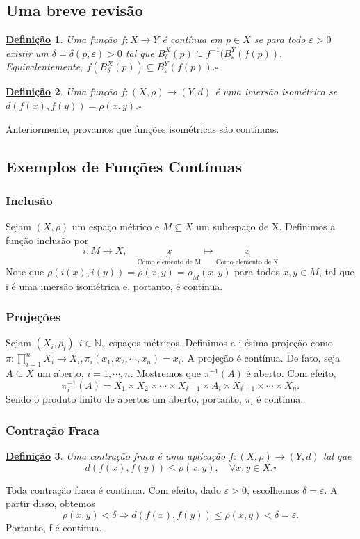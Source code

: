 \documentclass{article}
\newtheorem*{def*}{\underline{Defini\c c\~ao}}
\begin{document}
\subsection{Uma breve revisão}
 \begin{def*}
   Uma função \(f:X\rightarrow Y\) é contínua em \(p\in X\) se para todo \(\varepsilon >0\) existir um
  \(\delta =\delta (p, \varepsilon)>0\) tal que \(B_{\delta }^{X}(p)\subseteq{f^{-1}(B_{\varepsilon }^{Y}(f(p))}.\)
  Equivalentemente, \(f(B_{\delta }^{X}(p))\subseteq{B_{\varepsilon }^{Y}(f(p))}.\square\)
 \end{def*}
\begin{def*}
  Uma função \(f:(X, \rho )\rightarrow (Y, d)\) é uma imersão isométrica se \(d(f(x), f(y)) = \rho (x, y).\square\)
\end{def*}
  Anteriormente, provamos que funções isométricas são contínuas.
\subsection{Exemplos de Funções Contínuas}
\subsubsection{Inclusão}
  Sejam \((X, \rho )\) um espaço métrico e \(M\subseteq{X}\) um subespaço de X. Definimos a função inclusão por 
    \[
      i:M\rightarrow X,\quad \underbrace{x}_{\text{Como elemento de M}}\longmapsto \underbrace{x}_{\text{Como elemento de X}}
    \]
  Note que \(\rho (i(x), i(y)) = \rho (x, y) = \rho_{M}(x, y)\) para todos \(x, y\in M\), tal que i é uma imersão isométrica
e, portanto, é contínua.
\subsubsection{Projeções}
  Sejam \((X_{i}, \rho_{i}), i\in \mathbb{N},\) espaços métricos. Definimos a i-ésima projeção como
 \(\pi :\prod\limits_{i=1}^{n}X_{i}\rightarrow X_{i}, \pi_{i}(x_1, x_2, \cdots, x_{n}) = x_{i}.\) A projeção
 é contínua. De fato, seja \(A\subseteq{X}\) um aberto, \(i=1, \cdots, n.\) Mostremos que \(\pi^{-1}(A)\) é aberto. 
 Com efeito, 
   \[
     \pi_{i}^{-1}(A) = X_{1}\times X_{2}\times \cdots\times X_{i-1}\times A_{i}\times X_{i+1}\times \cdots\times X_{n}.
   \]
   Sendo o produto finito de abertos um aberto, portanto, \(\pi_{i}\) é contínua.
\subsubsection{Contração Fraca}
 \begin{def*}
   Uma contração fraca é uma aplicação \(f:(X, \rho )\rightarrow (Y, d)\) tal que 
     \[
       d(f(x), f(y))\leq \rho(x, y),\quad \forall x,y \in X.\square
     \]
 \end{def*}
 Toda contração fraca é contínua. Com efeito, dado \(\varepsilon > 0\), escolhemos \(\delta = \varepsilon\). A partir
disso, obtemos 
  \[
    \rho (x, y) < \delta \Rightarrow d(f(x), f(y))\leq \rho (x, y) < \delta =\varepsilon .
  \]
  Portanto, f é contínua.
\end{document}
